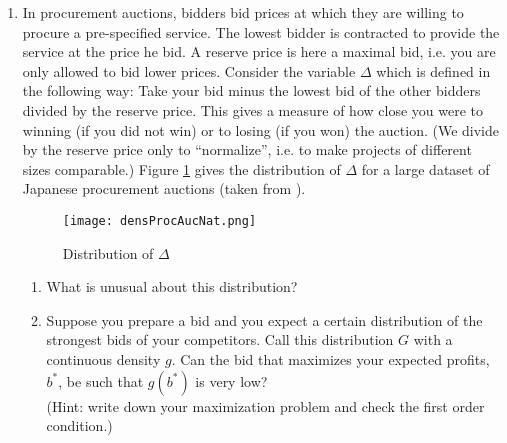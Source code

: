 \documentclass[a4paper,12pt]{article}
\begin{document}
\begin{enumerate}[resume]
  \item In procurement auctions, bidders bid prices at which they are willing to procure a pre-specified service. The lowest bidder is contracted to provide the service at the price he bid. A reserve price is here a maximal bid, i.e. you are only allowed to bid lower prices. Consider the variable $\Delta$ which is defined in the following way: Take your bid minus the lowest bid of the other bidders divided by the reserve price. This gives a measure of how close you were to winning (if you did not win) or to losing (if you won) the auction. (We divide by the reserve price only to ``normalize'', i.e. to make projects of different sizes comparable.) Figure \ref{fig:distProcAucNat} gives the distribution of $\Delta$ for a large dataset of Japanese procurement auctions (taken from \cite{chassang2020robust}). 

    \begin{figure}[h]
      \centering
      \texttt{[image: densProcAucNat.png]}
      \caption{Distribution of $\Delta$}
      \label{fig:distProcAucNat}
    \end{figure}

    \begin{enumerate}
    \item What is unusual about this distribution?
    \item Suppose you prepare a bid and you expect a certain distribution of the strongest bids of your competitors. Call this distribution $G$ with a continuous density $g$. Can the bid that maximizes your expected profits, $b^*$, be such that $g(b^*)$ is very low?\\
      (Hint: write down your maximization problem and check the first order condition.)
      

\end{enumerate}
\end{enumerate}
\end{document}
